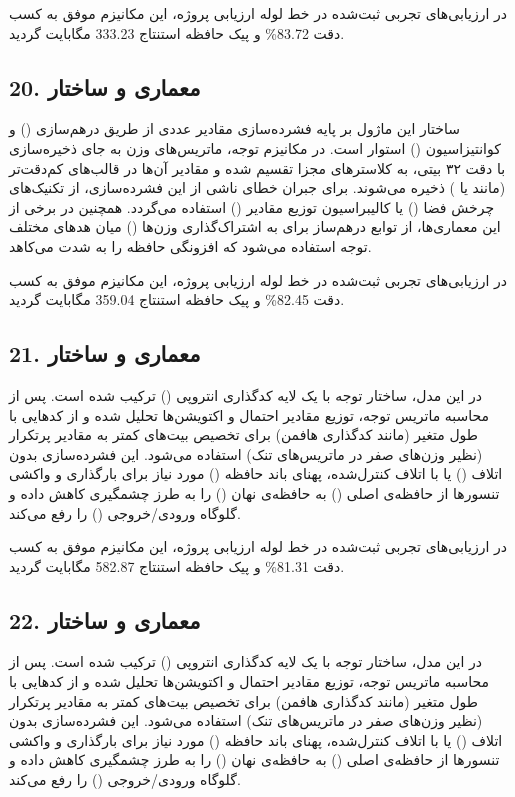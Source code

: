 \documentclass[12pt,a4paper]{report}
\theoremstyle{definition}
\begin{document}
در ارزیابی‌های تجربی ثبت‌شده در خط لوله ارزیابی پروژه، این مکانیزم موفق به کسب دقت 83.72\% و پیک حافظه استنتاج 333.23 مگابایت گردید.

\subsection*{20. معماری و ساختار }
ساختار این ماژول بر پایه فشرده‌سازی مقادیر عددی از طریق درهم‌سازی () و کوانتیزاسیون () استوار است. در مکانیزم توجه، ماتریس‌های وزن به جای ذخیره‌سازی با دقت ۳۲ بیتی، به کلاسترهای مجزا تقسیم شده و مقادیر آن‌ها در قالب‌های کم‌دقت‌تر (مانند  یا ) ذخیره می‌شوند. برای جبران خطای ناشی از این فشرده‌سازی، از تکنیک‌های چرخش فضا () یا کالیبراسیون توزیع مقادیر () استفاده می‌گردد. همچنین در برخی از این معماری‌ها، از توابع درهم‌ساز برای به اشتراک‌گذاری وزن‌ها () میان هد‌های مختلف توجه استفاده می‌شود که افزونگی حافظه را به شدت می‌کاهد.

در ارزیابی‌های تجربی ثبت‌شده در خط لوله ارزیابی پروژه، این مکانیزم موفق به کسب دقت 82.45\% و پیک حافظه استنتاج 359.04 مگابایت گردید.

\subsection*{21. معماری و ساختار }
در این مدل، ساختار توجه با یک لایه کدگذاری انتروپی () ترکیب شده است. پس از محاسبه ماتریس توجه، توزیع مقادیر احتمال و اکتویشن‌ها تحلیل شده و از کدهایی با طول متغیر (مانند کدگذاری هافمن) برای تخصیص بیت‌های کمتر به مقادیر پرتکرار (نظیر وزن‌های صفر در ماتریس‌های تنک) استفاده می‌شود. این فشرده‌سازی بدون اتلاف () یا با اتلاف کنترل‌شده، پهنای باند حافظه () مورد نیاز برای بارگذاری و واکشی تنسورها از حافظه‌ی اصلی () به حافظه‌ی نهان () را به طرز چشمگیری کاهش داده و گلوگاه ورودی/خروجی () را رفع می‌کند.

در ارزیابی‌های تجربی ثبت‌شده در خط لوله ارزیابی پروژه، این مکانیزم موفق به کسب دقت 81.31\% و پیک حافظه استنتاج 582.87 مگابایت گردید.

\subsection*{22. معماری و ساختار }
در این مدل، ساختار توجه با یک لایه کدگذاری انتروپی () ترکیب شده است. پس از محاسبه ماتریس توجه، توزیع مقادیر احتمال و اکتویشن‌ها تحلیل شده و از کدهایی با طول متغیر (مانند کدگذاری هافمن) برای تخصیص بیت‌های کمتر به مقادیر پرتکرار (نظیر وزن‌های صفر در ماتریس‌های تنک) استفاده می‌شود. این فشرده‌سازی بدون اتلاف () یا با اتلاف کنترل‌شده، پهنای باند حافظه () مورد نیاز برای بارگذاری و واکشی تنسورها از حافظه‌ی اصلی () به حافظه‌ی نهان () را به طرز چشمگیری کاهش داده و گلوگاه ورودی/خروجی () را رفع می‌کند.
\end{document}
